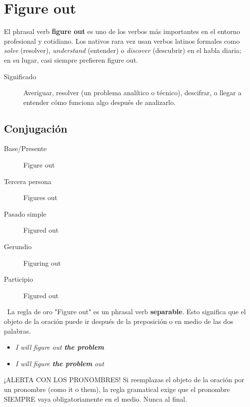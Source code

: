 \documentclass[
10pt, %
a4paper, %
oneside, %
headinclude,footinclude, %
BCOR5mm, %
]{scrartcl}
\begin{document}
\newpage
\section{Figure out}
El phrasal verb \textbf{figure out} es uno de los verbos más importantes en el entorno profesional y cotidiano. Los nativos rara vez usan verbos latinos formales como \textit{solve} (resolver), \textit{understand} (entender) o \textit{discover} (descubrir) en el habla diaria; en su lugar, casi siempre prefieren figure out.

\begin{description}
	\item[Significado] Averiguar, resolver (un problema analítico o técnico), descifrar, o llegar a entender cómo funciona algo después de analizarlo.
\end{description}

\subsection{Conjugación}
\begin{description}
	\item[Base/Presente] Figure out
	\item[Tercera persona] Figures out
	\item[Pasado simple] Figured out
	\item[Gerundio] Figuring out
	\item[Participio] Figured out
\end{description}

\begin{InfoBox}{\textcolor{Goldenrod}{} \, La regla de oro} 
	"Figure out" es un phrasal verb \textbf{separable}. Esto significa que el objeto de la oración puede ir después de la preposición o en medio de las dos palabras.
	
	\begin{itemize}
		\item \textcolor{green}{} \textit{I will figure out \textbf{the problem}}
		\item \textcolor{green}{} \textit{I will figure \textbf{the problem} out}
	\end{itemize}
\end{InfoBox}

¡ALERTA CON LOS PRONOMBRES! Si reemplazas el objeto de la oración por un pronombre (como it o them), la regla gramatical exige que el pronombre SIEMPRE vaya obligatoriamente en el medio. Nunca al final.
\end{document}
